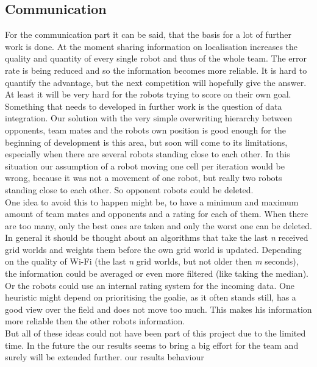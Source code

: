 \documentclass[lnicst,a4paper]{svmultln}
\begin{document}
\subsection{Communication}
\label{sec:results_communication}
For the communication part it can be said, that the basis for a lot of further work is done. At the moment sharing information on localisation increases the quality and quantity of every single robot and thus of the whole team. The error rate is being reduced and so the information becomes more reliable. It is hard to quantify the advantage, but the next competition will hopefully give the answer. At least it will be very hard for the robots trying to score on their own goal.
\\
Something that needs to developed in further work is the question of data integration. Our solution with the very simple overwriting hierarchy between opponents, team mates and the robots own position is good enough for the beginning of development is this area, but soon will come to its limitations, especially when there are several robots standing close to each other. In this situation our assumption of a robot moving one cell per iteration would be wrong, because it was not a movement of one robot, but really two robots standing close to each other. So opponent robots could be deleted. 
\\
One idea to avoid this to happen might be, to have a minimum and maximum amount of team mates and opponents and a rating for each of them. When there are too many, only the best ones are taken and only the worst one can be deleted.
\\
In general it should be thought about an algorithms that take the last \textit{n} received grid worlds and weights them before the own grid world is updated.  Depending on the quality of Wi-Fi (the last \textit{n} grid worlds, but not older then \textit{m} seconds), the information could be averaged or even more filtered (like taking the median). 
\\
Or the robots could use an internal rating system for the incoming data. One heuristic might depend on prioritising the goalie, as it often stands still, has a good view over the field and does not move too much. This makes his information more reliable then the other robots information. 
\\
But all of these ideas could not have been part of this project due to the limited time. In the future the our results seems to bring a big effort for the team and surely will be extended further.
our results
behaviour
\end{document}
